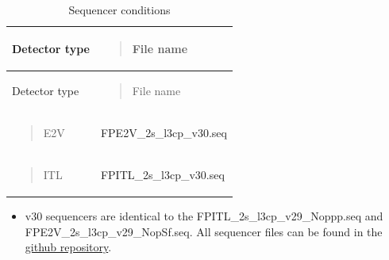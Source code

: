 \begin{longtable}[]{@{}
  >{\raggedright\arraybackslash}p{}
  >{\raggedright\arraybackslash}p{}@{}}
\caption{Sequencer conditions}\tabularnewline
\toprule\noalign{}
\begin{minipage}[b]{\linewidth}\raggedright
Detector type
\end{minipage} & \begin{minipage}[b]{\linewidth}\raggedright
\begin{quote}
File name
\end{quote}
\end{minipage} \\
\midrule\noalign{}
\endfirsthead
\toprule\noalign{}
\begin{minipage}[b]{\linewidth}\raggedright
Detector type
\end{minipage} & \begin{minipage}[b]{\linewidth}\raggedright
\begin{quote}
File name
\end{quote}
\end{minipage} \\
\midrule\noalign{}
\endhead
\bottomrule\noalign{}
\endlastfoot
\begin{minipage}[t]{\linewidth}\raggedright
\begin{quote}
E2V
\end{quote}
\end{minipage} &
FP\label{e2v_2s_l3cp_v30.seq}{E2V\_2s\_l3cp\_v30.seq} \\
\begin{minipage}[t]{\linewidth}\raggedright
\begin{quote}
ITL
\end{quote}
\end{minipage} &
FP\label{itl_2s_l3cp_v30.seq}{ITL\_2s\_l3cp\_v30.seq} \\
\end{longtable}

\begin{itemize}
\tightlist
\item
  v30 sequencers are identical to the
  FP\label{itl_2s_l3cp_v29_noppp.seq}{ITL\_2s\_l3cp\_v29\_Noppp.seq}
  and
  FP\label{e2v_2s_l3cp_v29_nopsf.seq}{E2V\_2s\_l3cp\_v29\_NopSf.seq}.
  All sequencer files can be found in the
  \href{https://github.com/lsst-camera-dh/sequencer-files/tree/master/run7}{github
  repository}.
\end{itemize}

